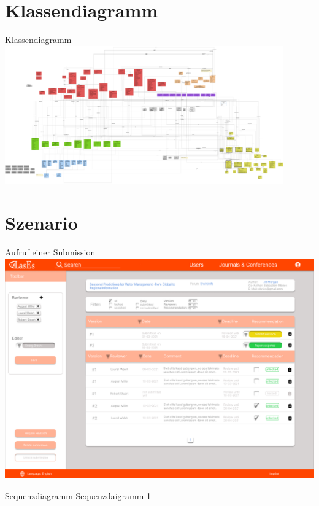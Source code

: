 \documentclass{beamer}
\begin{document}
    \section{Klassendiagramm}
    \begin{frame}{Klassendiagramm}
        \centering
        \includegraphics[width=0.9\textwidth]{../../docs/Entwurf/graphics/klassendiagramm_png.png}
    \end{frame}



    \section{Szenario}
    \begin{frame}{Aufruf einer Submission}
        \centering
        \includegraphics[width=\textwidth]{../../docs/Pflichtenheft/graphics/Submission-png.png}
    \end{frame}

    \begin{frame}{Sequenzdiagramm}
        \centering
        Sequenzdaigramm 1
    \end{frame}
\end{document}
